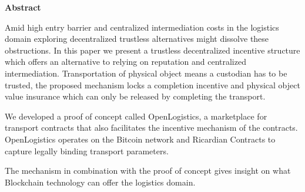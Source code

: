 \thispagestyle{empty}
\begin{center}
    \vspace{0.9cm}
    \textbf{Abstract}
\end{center}

Amid high entry barrier and centralized intermediation costs in the logistics domain exploring decentralized trustless alternatives might dissolve these obstructions. In this paper we present a trustless decentralized incentive structure which offers an alternative to relying on reputation and centralized intermediation. Transportation of physical object means a custodian has to be trusted, the proposed mechanism locks a completion incentive and physical object value insurance which can only be released by completing the transport. \par
We developed a proof of concept called OpenLogistics, a marketplace for transport contracts that also facilitates the incentive mechanism of the contracts. OpenLogistics operates on the Bitcoin network and Ricardian Contracts to capture legally binding transport parameters. \par
The mechanism in combination with the proof of concept gives insight on what  Blockchain technology can offer the logistics domain.


%
%
%
%
%
%

